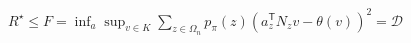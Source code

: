 \(R^{\star}\le F=\inf_a\sup_{v\in K}\sum_{z\in\Omega_n}p_{\pi}(z)(a_z^{\mathsf T}N_zv-\theta(v))^2=\mathcal D\)